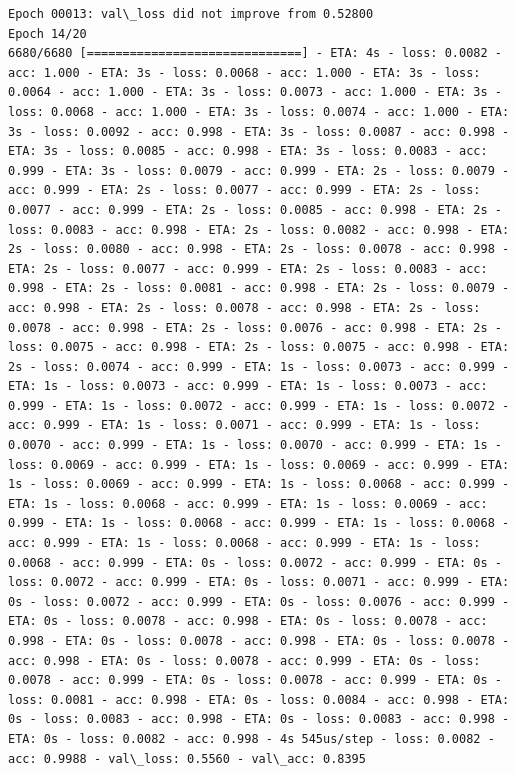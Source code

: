 \documentclass[11pt]{article}
\begin{document}
\begin{Verbatim}[commandchars=\\\{\}]
Epoch 00013: val\_loss did not improve from 0.52800
Epoch 14/20
6680/6680 [==============================] - ETA: 4s - loss: 0.0082 - acc: 1.000 - ETA: 3s - loss: 0.0068 - acc: 1.000 - ETA: 3s - loss: 0.0064 - acc: 1.000 - ETA: 3s - loss: 0.0073 - acc: 1.000 - ETA: 3s - loss: 0.0068 - acc: 1.000 - ETA: 3s - loss: 0.0074 - acc: 1.000 - ETA: 3s - loss: 0.0092 - acc: 0.998 - ETA: 3s - loss: 0.0087 - acc: 0.998 - ETA: 3s - loss: 0.0085 - acc: 0.998 - ETA: 3s - loss: 0.0083 - acc: 0.999 - ETA: 3s - loss: 0.0079 - acc: 0.999 - ETA: 2s - loss: 0.0079 - acc: 0.999 - ETA: 2s - loss: 0.0077 - acc: 0.999 - ETA: 2s - loss: 0.0077 - acc: 0.999 - ETA: 2s - loss: 0.0085 - acc: 0.998 - ETA: 2s - loss: 0.0083 - acc: 0.998 - ETA: 2s - loss: 0.0082 - acc: 0.998 - ETA: 2s - loss: 0.0080 - acc: 0.998 - ETA: 2s - loss: 0.0078 - acc: 0.998 - ETA: 2s - loss: 0.0077 - acc: 0.999 - ETA: 2s - loss: 0.0083 - acc: 0.998 - ETA: 2s - loss: 0.0081 - acc: 0.998 - ETA: 2s - loss: 0.0079 - acc: 0.998 - ETA: 2s - loss: 0.0078 - acc: 0.998 - ETA: 2s - loss: 0.0078 - acc: 0.998 - ETA: 2s - loss: 0.0076 - acc: 0.998 - ETA: 2s - loss: 0.0075 - acc: 0.998 - ETA: 2s - loss: 0.0075 - acc: 0.998 - ETA: 2s - loss: 0.0074 - acc: 0.999 - ETA: 1s - loss: 0.0073 - acc: 0.999 - ETA: 1s - loss: 0.0073 - acc: 0.999 - ETA: 1s - loss: 0.0073 - acc: 0.999 - ETA: 1s - loss: 0.0072 - acc: 0.999 - ETA: 1s - loss: 0.0072 - acc: 0.999 - ETA: 1s - loss: 0.0071 - acc: 0.999 - ETA: 1s - loss: 0.0070 - acc: 0.999 - ETA: 1s - loss: 0.0070 - acc: 0.999 - ETA: 1s - loss: 0.0069 - acc: 0.999 - ETA: 1s - loss: 0.0069 - acc: 0.999 - ETA: 1s - loss: 0.0069 - acc: 0.999 - ETA: 1s - loss: 0.0068 - acc: 0.999 - ETA: 1s - loss: 0.0068 - acc: 0.999 - ETA: 1s - loss: 0.0069 - acc: 0.999 - ETA: 1s - loss: 0.0068 - acc: 0.999 - ETA: 1s - loss: 0.0068 - acc: 0.999 - ETA: 1s - loss: 0.0068 - acc: 0.999 - ETA: 1s - loss: 0.0068 - acc: 0.999 - ETA: 0s - loss: 0.0072 - acc: 0.999 - ETA: 0s - loss: 0.0072 - acc: 0.999 - ETA: 0s - loss: 0.0071 - acc: 0.999 - ETA: 0s - loss: 0.0072 - acc: 0.999 - ETA: 0s - loss: 0.0076 - acc: 0.999 - ETA: 0s - loss: 0.0078 - acc: 0.998 - ETA: 0s - loss: 0.0078 - acc: 0.998 - ETA: 0s - loss: 0.0078 - acc: 0.998 - ETA: 0s - loss: 0.0078 - acc: 0.998 - ETA: 0s - loss: 0.0078 - acc: 0.999 - ETA: 0s - loss: 0.0078 - acc: 0.999 - ETA: 0s - loss: 0.0078 - acc: 0.999 - ETA: 0s - loss: 0.0081 - acc: 0.998 - ETA: 0s - loss: 0.0084 - acc: 0.998 - ETA: 0s - loss: 0.0083 - acc: 0.998 - ETA: 0s - loss: 0.0083 - acc: 0.998 - ETA: 0s - loss: 0.0082 - acc: 0.998 - 4s 545us/step - loss: 0.0082 - acc: 0.9988 - val\_loss: 0.5560 - val\_acc: 0.8395


\end{Verbatim}
\end{document}
